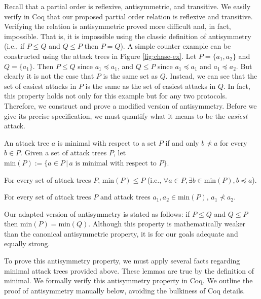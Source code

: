\documentclass[runningheads]{llncs}
\theoremstyle{definition}
\begin{document}
Recall that a partial order is reflexive, antisymmetric, and
transitive. We easily verify in Coq that our proposed partial order
relation is reflexive and transitive. Verifying the relation is
antisymmetric proved more difficult and, in fact, impossible. That is,
it is impossible using the classic definition of antisymmetry (i.e.,
if $P \le Q$ and $Q \le P$ then $P = Q$). A simple counter example can
be constructed using the attack trees in Figure
\ref{fig:chase-ex}. Let $P = \{a_1,a_2\}$ and $Q = \{a_1\}$. Then
$P \le Q$ since $a_1 \preceq a_1$, and $Q \le P$ since
$a_1 \preceq a_1$ and $a_1 \preceq a_2$. But clearly it is not the
case that $P$ is the same set as $Q$. Instead, we can see that the set
of easiest attacks in $P$ is the same as the set of easiest attacks in
$Q$. In fact, this property holds not only for this example but for
any two protocols. Therefore, we construct and prove a modified
version of antisymmetry. Before we give its precise specification, we
must quantify what it means to be the \emph{easiest} attack.

\begin{definition}
  An attack tree $a$ is minimal with respect to a set $P$ if and only
  $b \nprec a$ for every $b \in P$. Given a set of attack trees $P$,
  let $\text{min}(P) := \{a \in P \,|\, a \text{ is minimal with
    respect to } P \}$. 
\end{definition}

\begin{lemma}
  For every set of attack trees $P$, $\text{min}(P) \le P$ (i.e.,
  $\forall a \in P, \exists b \in \text{min}(P), b \preceq a$). 
\end{lemma}

\begin{lemma}
  For every set of attack trees $P$ and attack trees $a_1, a_2 \in
  \text{min}(P)$, $a_1 \nprec a_2$. 
\end{lemma}

Our adapted version of antisymmetry is stated as follows: if $P \le Q$
and $Q \le P$ then $\text{min}(P) = \text{min}(Q)$. Although this
property is mathematically weaker than the canonical antisymmetric
property, it is for our goals adequate and equally strong. 

To prove this antisymmetry property, we must apply several facts
regarding minimal attack trees provided above. These lemmas are true
by the definition of minimal. We formally verify this antisymmetry
property in Coq.  We outline the proof of antisymmetry manually below,
avoiding the bulkiness of Coq details.
\end{document}
